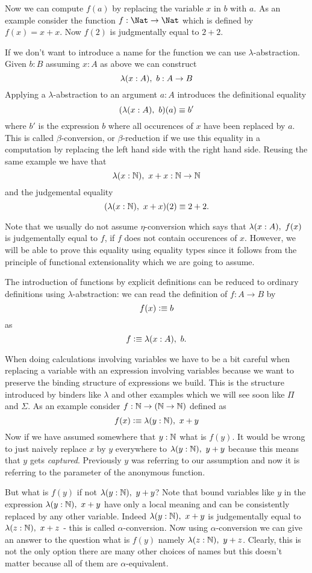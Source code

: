 Now we can compute $f(a)$ by replacing the variable $x$ in $b$ with
$a$. As an example consider the function $f : \Nat \to \Nat$ which is
defined by $f(x) = x+x$. Now $f(2)$ is judgmentally equal to $2+2$.

If we don't want to introduce a name for the function we can use
$\lambda$-abstraction. Given $b : B$ assuming $x:A$ as above we can
construct 
\[ \lam{x:A}b : A \to B \]
Applying a $\lambda$-abstraction to an argument $a:A$ introduces the
definitional equality 
\[(\lam{x:A}b)(a) \jdeq b'\]
 where $b'$ is the
expression $b$ where all occurences of $x$ have been replaced by $a$.
This is called $\beta$-conversion, or $\beta$-reduction if we use this
equality in a computation by replacing the left hand side with the
right hand side. Reusing the same example we have that
\[ \lam{x:\nat}x+x : \nat \to \nat \]
and the judgemental equality
\[ (\lam{x:\nat}x+x)(2) \jdeq 2+2. \]

Note that we usually do not assume $\eta$-conversion which 
says that $\lam{x:A}f(x)$ is judgementally equal to $f$, if $f$ does not contain 
occurences of $x$. However, we will be able to prove this equality
using equality types since it follows from the principle of functional
extensionality which we are going to assume.

The introduction of functions by explicit definitions can be reduced
to ordinary definitions using $\lambda$-abstraction: we can read 
the definition of $f: A\to B$ by
\[ f(x) \vcentcolon\equiv b \]
as 
\[ f \defeq \lam{x:A}b .\]

When doing calculations involving variables we have to be a bit
careful when replacing a variable with an expression involving
variables because we want to preserve the binding structure of
expressions we build. This is the structure introduced by binders like
$\lambda$ and other examples which we will see soon like $\Pi$ and
$\Sigma$. As an example consider $f : \mathbb{N} \to (\mathbb{N} \to \mathbb{N})$
defined as 
\[ f(x) \defeq \lam{y:\nat} x + y \]
Now if we have assumed somewhere that $y : \mathbb{N}$ what is 
$f(y)$. It would be wrong to just naively replace $x$ by $y$
everywhere to $\lam{y:\nat} y + y$ because this means that $y$ gets
\emph{captured}. Previously $y$ was referring to our assumption and
now it is referring to the parameter of the anonymous function. 

But what is $f(y)$ if not $\lam{y:\nat} y + y$? Note that bound
variables like $y$ in the expression $\lam{y:\nat} x + y$
have only a local meaning and can be consistently replaced by any
other variable. Indeed $\lam{y:\nat} x + y$ is judgementally equal to
$\lam{z:\nat} x + z$ - this is called $\alpha$-conversion. Now
using $\alpha$-conversion we can give an answer to the question 
what is $f(y)$ namely  $\lam{z:\nat} y + z$. Clearly, this is not
the only option there are many other choices of names but this doesn't
matter because all of them are $\alpha$-equivalent.

